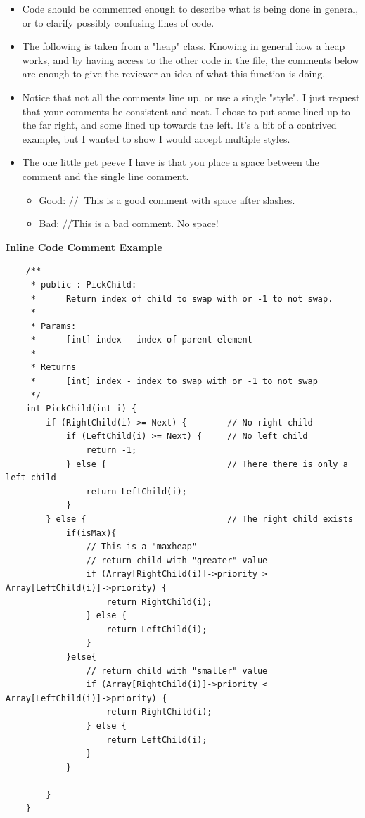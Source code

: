 
\begin{itemize}
    \item Code should be commented enough to describe what is being done in general, or to clarify possibly confusing lines of code.
    \item The following is taken from a "heap" class. Knowing in general how a heap works, and by having access to the other code in the file, the comments below are enough to give the reviewer an idea of what this function is doing. 
    \item Notice that not all the comments line up, or use a single "style". I just request that your comments be consistent and neat. I chose to put some lined up to the far right, and some lined up towards the left. It's a bit of a contrived example, but I wanted to show I would accept multiple styles. 
    \item The one little pet peeve I have is that you place a space between the comment and the single line comment.
    \begin{itemize}
        \item Good: $//\;\;$This is a good comment with space after slashes.
        \item Bad: $//$This is a bad comment. No space!
    \end{itemize}
\end{itemize}

\textbf{Inline Code Comment Example}\\
\begin{verbatim}
    /**
     * public : PickChild:
     *      Return index of child to swap with or -1 to not swap.
     * 
     * Params:
     *      [int] index - index of parent element
     * 
     * Returns
     *      [int] index - index to swap with or -1 to not swap
     */
    int PickChild(int i) {
        if (RightChild(i) >= Next) {        // No right child
            if (LeftChild(i) >= Next) {     // No left child
                return -1;              
            } else {                        // There there is only a left child
                return LeftChild(i);
            }
        } else {                            // The right child exists 
            if(isMax){  
                // This is a "maxheap"
                // return child with "greater" value
                if (Array[RightChild(i)]->priority > Array[LeftChild(i)]->priority) {
                    return RightChild(i);
                } else {
                    return LeftChild(i);
                }
            }else{
                // return child with "smaller" value
                if (Array[RightChild(i)]->priority < Array[LeftChild(i)]->priority) {
                    return RightChild(i);
                } else {
                    return LeftChild(i);
                }   
            }

        }
    }
\end{verbatim}
